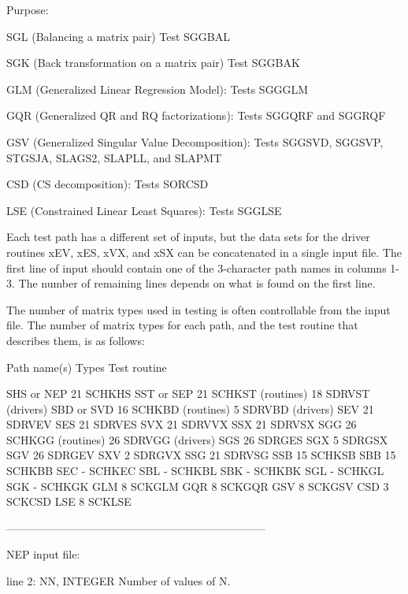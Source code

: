 \begin{DoxyParagraph}{Purpose\+: }
\begin{DoxyVerb}
 SGL (Balancing a matrix pair)
     Test SGGBAL

 SGK (Back transformation on a matrix pair)
     Test SGGBAK

 GLM (Generalized Linear Regression Model):
     Tests SGGGLM

 GQR (Generalized QR and RQ factorizations):
     Tests SGGQRF and SGGRQF

 GSV (Generalized Singular Value Decomposition):
     Tests SGGSVD, SGGSVP, STGSJA, SLAGS2, SLAPLL, and SLAPMT

 CSD (CS decomposition):
     Tests SORCSD

 LSE (Constrained Linear Least Squares):
     Tests SGGLSE

 Each test path has a different set of inputs, but the data sets for
 the driver routines xEV, xES, xVX, and xSX can be concatenated in a
 single input file.  The first line of input should contain one of the
 3-character path names in columns 1-3.  The number of remaining lines
 depends on what is found on the first line.

 The number of matrix types used in testing is often controllable from
 the input file.  The number of matrix types for each path, and the
 test routine that describes them, is as follows:

 Path name(s)  Types    Test routine

 SHS or NEP      21     SCHKHS
 SST or SEP      21     SCHKST (routines)
                 18     SDRVST (drivers)
 SBD or SVD      16     SCHKBD (routines)
                  5     SDRVBD (drivers)
 SEV             21     SDRVEV
 SES             21     SDRVES
 SVX             21     SDRVVX
 SSX             21     SDRVSX
 SGG             26     SCHKGG (routines)
                 26     SDRVGG (drivers)
 SGS             26     SDRGES
 SGX              5     SDRGSX
 SGV             26     SDRGEV
 SXV              2     SDRGVX
 SSG             21     SDRVSG
 SSB             15     SCHKSB
 SBB             15     SCHKBB
 SEC              -     SCHKEC
 SBL              -     SCHKBL
 SBK              -     SCHKBK
 SGL              -     SCHKGL
 SGK              -     SCHKGK
 GLM              8     SCKGLM
 GQR              8     SCKGQR
 GSV              8     SCKGSV
 CSD              3     SCKCSD
 LSE              8     SCKLSE

-----------------------------------------------------------------------

 NEP input file:

 line 2:  NN, INTEGER
          Number of values of N.


\end{DoxyVerb}
\end{DoxyParagraph}
